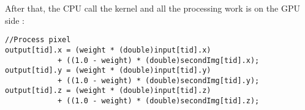 \documentclass[11pt]{article} %
\begin{document}
After that, the CPU call the kernel and all the processing work is on the GPU side :

\begin{lstlisting}[style=CStyle]
//Process pixel
output[tid].x = (weight * (double)input[tid].x) 
			+ ((1.0 - weight) * (double)secondImg[tid].x);
output[tid].y = (weight * (double)input[tid].y) 
			+ ((1.0 - weight) * (double)secondImg[tid].y);
output[tid].z = (weight * (double)input[tid].z) 
			+ ((1.0 - weight) * (double)secondImg[tid].z);
\end{lstlisting}

\end{document}
